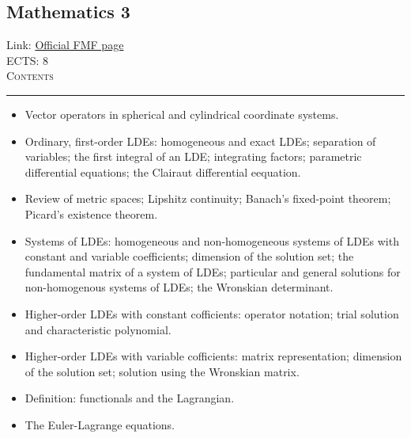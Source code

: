 \documentclass[11pt, a4paper]{article}
\newenvironment{course}[3]{
\subsection{#1}%
Link: \href{#2}{Official FMF page}\\%
ECTS: #3%
\vspace{1ex}
\\
{\large \textsc{Contents}}\\[-0.9ex]%
\rule{\textwidth}{0.5pt}
\vspace{-3ex}
}
{}
\newenvironment{chapter}[1]{
\begin{tcolorbox}[title=#1, breakable]
}
{\end{tcolorbox}}
\begin{document}
\begin{course}{Mathematics 3}{https://www.fmf.uni-lj.si/en/study-physics/programmes/1fiz/2020/7000777/courses/522/}{8}
\begin{chapter}{Vector calculus}
\begin{itemize}
            \item Vector operators in spherical and cylindrical coordinate systems.
        
        \end{itemize}
        \end{chapter}

        \begin{chapter}{Ordinary differential equations}
            
            \begin{itemize}
            
                \item Ordinary, first-order LDEs: homogeneous and exact LDEs; separation of variables; the first integral of an LDE; integrating factors; parametric differential equations; the Clairaut differential eequation.

                \item Review of metric spaces; Lipshitz continuity; Banach's fixed-point theorem; Picard's existence theorem.

                \item Systems of LDEs: homogeneous and non-homogeneous systems of LDEs with constant and variable coefficients; dimension of the solution set; the fundamental matrix of a system of LDEs; particular and general solutions for non-homogenous systems of LDEs; the Wronskian determinant.

                \item Higher-order LDEs with constant cofficients: operator notation; trial solution and characteristic polynomial.

                \item Higher-order LDEs with variable cofficients: matrix representation; dimension of the solution set; solution using the Wronskian matrix.

            \end{itemize}

        \end{chapter}

        \begin{chapter}{Calculus of variations}
            \begin{itemize}
                
                \item Definition: functionals and the Lagrangian.

                \item The Euler-Lagrange equations.


\end{itemize}
\end{chapter}
\end{course}
\end{document}
